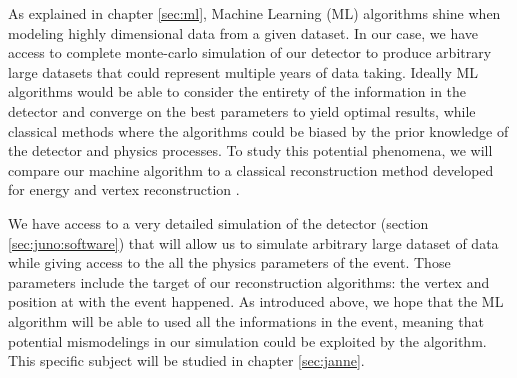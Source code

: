 
As explained in chapter \ref{sec:ml}, Machine Learning (ML) algorithms shine when modeling highly dimensional data from a given dataset. In our case, we have access to complete monte-carlo simulation of our detector to produce arbitrary large datasets that could represent multiple years of data taking.
Ideally ML algorithms would be able to consider the entirety of the information in the detector and converge on the best parameters to yield optimal results, while classical methods where the algorithms could be biased by the prior knowledge of the detector and physics processes. To study this potential phenomena, we will compare our machine algorithm to a classical reconstruction method developed for energy and vertex reconstruction \cite{lebrin_towards_2022}.

We have access to a very detailed simulation of the detector (section \ref{sec:juno:software}) that will allow us to simulate arbitrary large dataset of data while giving access to the all the physics parameters of the event. Those parameters include the target of our reconstruction algorithms: the vertex and position at with the event happened. As introduced above, we hope that the ML algorithm will be able to used all the informations in the event, meaning that potential mismodelings in our simulation could be exploited by the algorithm. This specific subject will be studied in chapter \ref{sec:janne}.

